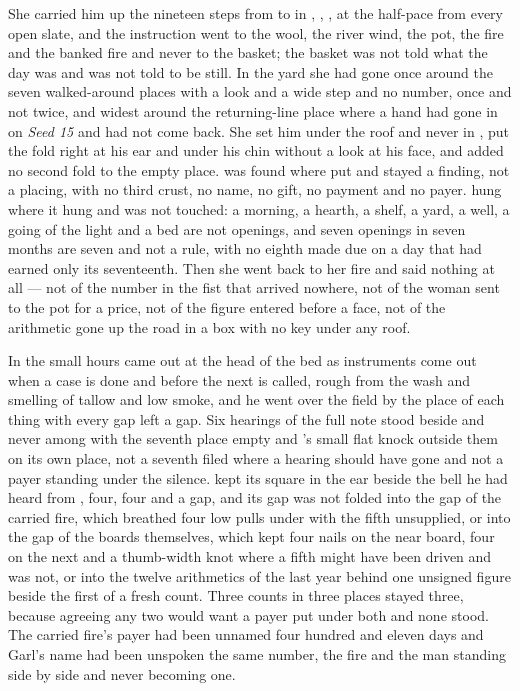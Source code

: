She carried him up the nineteen steps from  to  in , , , at the half-pace from every open slate, and the instruction went to the wool, the river wind, the pot, the fire and the banked fire and never to the basket; the basket was not told what the day was and was not told to be still. In the yard she had gone once around the seven walked-around places with a look and a wide step and no number, once and not twice, and widest around the returning-line place where a hand had gone in on \emph{Seed 15} and had not come back. She set him under the roof and never in , put the fold right at his ear and under his chin without a look at his face, and added no second fold to the empty place.  was found where put and stayed a finding, not a placing, with no third crust, no name, no gift, no payment and no payer.  hung where it hung and was not touched: a morning, a hearth, a shelf, a yard, a well, a going of the light and a bed are not openings, and seven openings in seven months are seven and not a rule, with no eighth made due on a day that had earned only its seventeenth. Then she went back to her fire and said nothing at all --- not of the number in the fist that arrived nowhere, not of the woman sent to the pot for a price, not of the figure entered before a face, not of the arithmetic gone up the road in a box with no key under any roof.

\scenebreak

In the small hours  came out at the head of the bed as instruments come out when a case is done and before the next is called, rough from the wash and smelling of tallow and low smoke, and he went over the field by the place of each thing with every gap left a gap. Six hearings of the full note stood beside and never among with the seventh place empty and 's small flat knock outside them on its own place, not a seventh filed where a hearing should have gone and not a payer standing under the silence.  kept its square in the ear beside the bell he had heard from , four, four and a gap, and its gap was not folded into the gap of the carried fire, which breathed four low pulls under  with the fifth unsupplied, or into the gap of the boards themselves, which kept four nails on the near board, four on the next and a thumb-width knot where a fifth might have been driven and was not, or into the twelve arithmetics of the last year behind one unsigned figure beside the first of a fresh count. Three counts in three places stayed three, because agreeing any two would want a payer put under both and none stood. The carried fire's payer had been unnamed four hundred and eleven days and Garl's name had been unspoken the same number, the fire and the man standing side by side and never becoming one.

